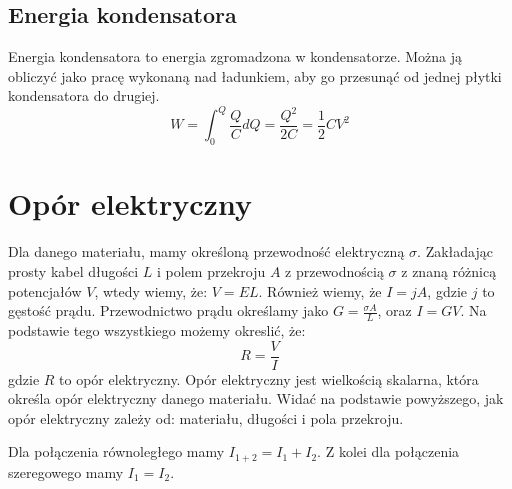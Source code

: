 \documentclass{../notatki}
\begin{document}
\subsection{Energia kondensatora}

Energia kondensatora to energia zgromadzona w kondensatorze. Można ją
obliczyć jako pracę wykonaną nad ładunkiem, aby go przesunąć od jednej płytki
kondensatora do drugiej.
$$
W = \int_{0}^{Q} \frac{Q}{C} dQ = \frac{Q^2}{2C} = \frac{1}{2} C V^2
$$

\section{Opór elektryczny}

Dla danego materiału, mamy określoną przewodność elektryczną $\sigma$.
Zakładając prosty kabel długości $L$ i polem przekroju $A$ z przewodnością
$\sigma$ z znaną różnicą potencjałów $V$, wtedy wiemy, że: $V = EL$. Również
wiemy, że $I = jA$, gdzie $j$ to gęstość prądu. Przewodnictwo prądu określamy
jako $G = \frac{\sigma A}{L}$, oraz $I = GV$. Na podstawie tego wszystkiego
możemy okreslić, że:
$$
R = \frac{V}{I}
$$
gdzie $R$ to opór elektryczny. Opór
elektryczny jest wielkością skalarna, która określa opór elektryczny danego
materiału. Widać na podstawie powyższego, jak opór elektryczny zależy od:
materiału, długości i pola przekroju.

\begin{figure*}[h]
  \centering
\end{figure*}
Dla połączenia równoległego mamy $I_{1+2} = I_1 + I_2$. Z kolei dla
połączenia szeregowego mamy $I_1 = I_2$.
\end{document}
